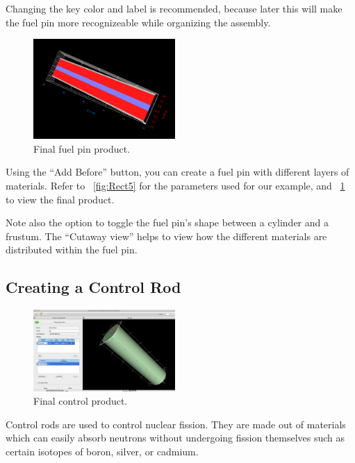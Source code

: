 Changing the key color and label is recommended, because later this will make the fuel pin more recognizeable while organizing the assembly.

\begin{figure}
  \begin{center}
    \includegraphics[width=0.48\textwidth]{Images/rect-pin.png}
  \end{center}
  \caption{Final fuel pin product.}
  \label{fig:Rect6}
\end{figure}
Using the ``Add Before'' button, you can create a fuel pin with different layers of materials.  Refer to ~\ref{fig:Rect5} for the parameters used for our example, and ~\ref{fig:Rect6} to view the final product.

Note also the option to toggle the fuel pin's shape between a cylinder and a frustum.  The ``Cutaway view'' helps to view how the different materials are distributed within the fuel pin.

\subsection{Creating a Control Rod}
\begin{figure}
  \begin{center}
    \includegraphics[width=0.48\textwidth]{Images/rect-control-rod.png}
  \end{center}
  \caption{Final control product.}
  \label{fig:Rect7}
\end{figure}
Control rods are used to control nuclear fission. They are made out of materials which can easily absorb neutrons without undergoing fission themselves such as certain isotopes of boron, silver, or cadmium.

